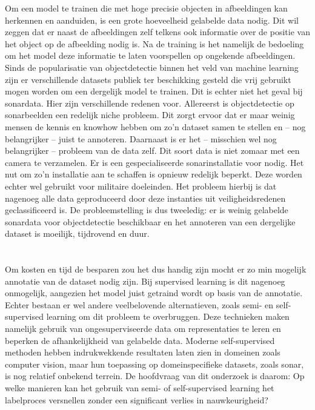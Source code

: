 Om een model te trainen die met hoge precisie objecten in afbeeldingen kan herkennen en aanduiden, is een grote hoeveelheid gelabelde data nodig. Dit wil zeggen dat er naast de afbeeldingen zelf telkens ook informatie over de positie van het object op de afbeelding nodig is. Na de training is het namelijk de bedoeling om het model deze informatie te laten voorspellen op ongekende afbeeldingen. Sinds de popularisatie van objectdetectie binnen het veld van machine learning zijn er verschillende datasets publiek ter beschikking gesteld die vrij gebruikt mogen worden om een dergelijk model te trainen. Dit is echter niet het geval bij sonardata. Hier zijn verschillende redenen voor. Allereerst is objectdetectie op sonarbeelden een redelijk niche probleem. Dit zorgt ervoor dat er maar weinig mensen de kennis en knowhow hebben om zo'n dataset samen te stellen en -- nog belangrijker -- juist te annoteren. Daarnaast is er het -- misschien wel nog belangrijker -- probleem van de data zelf. Dit soort data is niet zomaar met een camera te verzamelen. Er is een gespecialiseerde sonarinstallatie voor nodig. Het nut om zo'n installatie aan te schaffen is opnieuw redelijk beperkt. Deze worden echter wel gebruikt voor militaire doeleinden. Het probleem hierbij is dat nagenoeg alle data geproduceerd door deze instanties uit veiligheidsredenen geclassificeerd is. De probleemstelling is dus tweeledig: er is weinig gelabelde sonardata voor objectdetectie beschikbaar en het annoteren van een dergelijke dataset is moeilijk, tijdrovend en duur.

\section{}%
\label{sec:onderzoeksvraag}

Om kosten en tijd de besparen zou het dus handig zijn mocht er zo min mogelijk annotatie van de dataset nodig zijn. Bij supervised learning is dit nagenoeg onmogelijk, aangezien het model juist getraind wordt op basis van de annotatie. Echter bestaan er wel andere veelbelovende alternatieven, zoals semi- en self-supervised learning om dit probleem te overbruggen. Deze technieken maken namelijk gebruik van ongesuperviseerde data om representaties te leren en beperken de afhankelijkheid van gelabelde data. Moderne self-supervised methoden hebben indrukwekkende resultaten laten zien in domeinen zoals computer vision, maar hun toepassing op domeinspecifieke datasets, zoals sonar, is nog relatief onbekend terrein. De hoofdvraag van dit onderzoek is daarom: Op welke manieren kan het gebruik van semi- of self-supervised learning het labelproces versnellen zonder een significant verlies in nauwkeurigheid?

